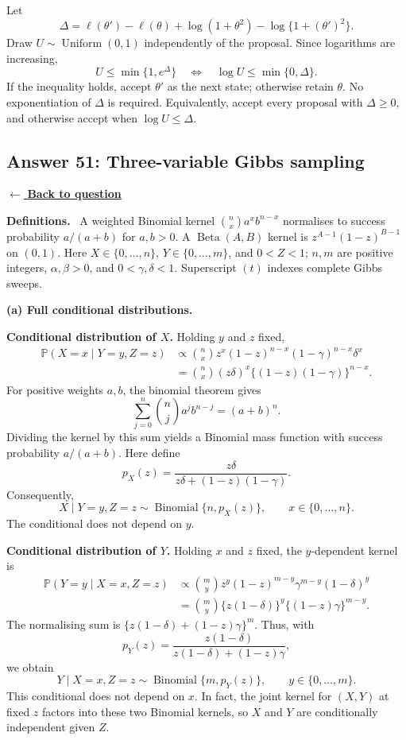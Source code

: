 \documentclass[11pt,a4paper]{article}
\newcommand{\given}{\mathrel{|}}
\newcommand{\answernav}[1]{%
  \label{answer:#1}%
  \noindent\hyperref[question:#1]{$\leftarrow$ \textbf{Back to question}}%
  \par\smallskip}
\newcommand{\studyheading}[1]{%
  \par\medskip\noindent\textcolor{statblue}{\textbf{#1.}}\ }
\begin{document}
Let
\[
\Delta=\ell(\theta')-\ell(\theta)
+\log(1+\theta^2)-\log\{1+(\theta')^2\}.
\]
Draw $U\sim\operatorname{Uniform}(0,1)$ independently of the proposal.
Since logarithms are increasing,
\[
U\le\min\{1,e^\Delta\}
\quad\Longleftrightarrow\quad
\boxed{\log U\le\min\{0,\Delta\}.}
\]
If the inequality holds, accept $\theta'$ as the next state; otherwise
retain $\theta$. No exponentiation of $\Delta$ is required. Equivalently,
accept every proposal with $\Delta\ge0$, and otherwise accept when
$\log U\le\Delta$.

\clearpage

\subsection{Answer 51: Three-variable Gibbs sampling}
\answernav{51}

\studyheading{Definitions}
A weighted Binomial kernel $\binom nx a^xb^{n-x}$ normalises to success probability $a/(a+b)$ for $a,b>0$.
A $\operatorname{Beta}(A,B)$ kernel is $z^{A-1}(1-z)^{B-1}$ on $(0,1)$.
Here $X\in\{0,\ldots,n\}$, $Y\in\{0,\ldots,m\}$, and $0<Z<1$; $n,m$ are positive integers, $\alpha,\beta>0$, and $0<\gamma,\delta<1$.
Superscript $(t)$ indexes complete Gibbs sweeps.

\textbf{(a) Full conditional distributions.}

\textbf{Conditional distribution of $X$.}
Holding $y$ and $z$ fixed,
\begin{align*}
\mathbb{P}(X=x\given Y=y,Z=z)
&\propto\binom nx z^x(1-z)^{n-x}(1-\gamma)^{n-x}\delta^x\\
&=\binom nx(z\delta)^x\{(1-z)(1-\gamma)\}^{n-x}.
\end{align*}
For positive weights $a,b$, the binomial theorem gives
\[
\sum_{j=0}^n\binom nj a^j b^{n-j}=(a+b)^n.
\]
Dividing the kernel by this sum yields a Binomial mass function with
success probability $a/(a+b)$. Here define
\[
p_X(z)=\frac{z\delta}{z\delta+(1-z)(1-\gamma)}.
\]
Consequently,
\[
\boxed{X\given Y=y,Z=z\sim\operatorname{Binomial}\{n,p_X(z)\},
\qquad x\in\{0,\ldots,n\}.}
\]
The conditional does not depend on $y$.

\textbf{Conditional distribution of $Y$.}
Holding $x$ and $z$ fixed, the $y$-dependent kernel is
\begin{align*}
\mathbb{P}(Y=y\given X=x,Z=z)
&\propto\binom my z^y(1-z)^{m-y}\gamma^{m-y}(1-\delta)^y\\
&=\binom my\{z(1-\delta)\}^y\{(1-z)\gamma\}^{m-y}.
\end{align*}
The normalising sum is $\{z(1-\delta)+(1-z)\gamma\}^m$. Thus, with
\[
p_Y(z)=\frac{z(1-\delta)}{z(1-\delta)+(1-z)\gamma},
\]
we obtain
\[
\boxed{Y\given X=x,Z=z\sim\operatorname{Binomial}\{m,p_Y(z)\},
\qquad y\in\{0,\ldots,m\}.}
\]
This conditional does not depend on $x$. In fact, the joint kernel for
$(X,Y)$ at fixed $z$ factors into these two Binomial kernels, so
$X$ and $Y$ are conditionally independent given $Z$.
\end{document}
